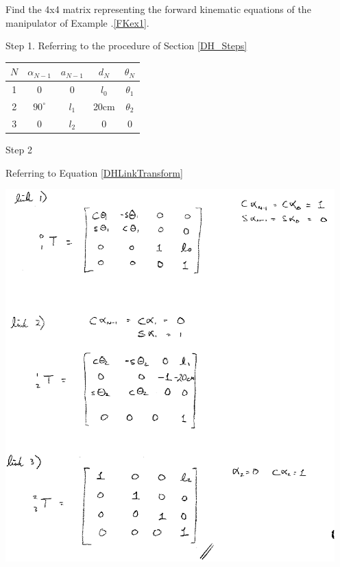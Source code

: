 %
%
\begin{Example}
Find the 4x4 matrix representing the forward kinematic equations of the manipulator of Example \thechapter.\ref{FKex1}.
\vspace{0.075in}

Step 1.  Referring to the procedure of Section \ref{DH_Steps}

\begin{tabular}{|c|c|c|c|c|} \hline
$N$	&  $\alpha_{N-1}$   &  $a_{N-1}$    	& $d_N$		&  $\theta_N$  	\\ \hline
1	&     0        &     0			&  $l_0$	&  $\theta_1$  	\\ \hline
2	&   $90^{\circ}$	& $l_1$	&  20cm		&  $\theta_2$  		\\ \hline
3	&   0	&    $l_2$ 			&  0		&    0         	\\ \hline
\end{tabular}

\vspace{0.075in}

Step 2

Referring to Equation \ref{DHLinkTransform}

\includegraphics[width=5.0in]{figs03/00413.eps}
\end{Example}

